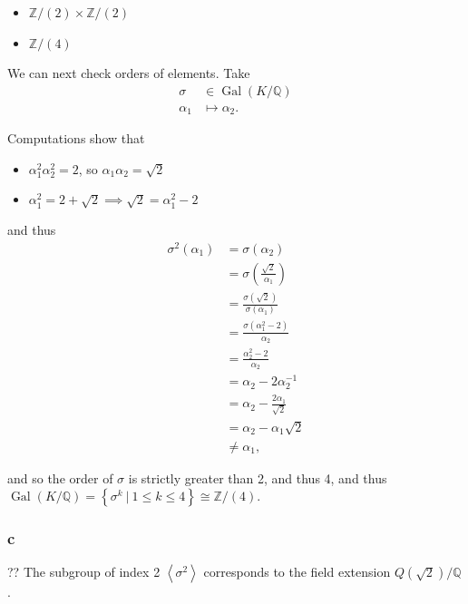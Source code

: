 \begin{solution}
\begin{itemize}
\tightlist
\item
  \({\mathbb{Z}}/(2) \times{\mathbb{Z}}/(2)\)
\item
  \({\mathbb{Z}}/(4)\)
\end{itemize}

We can next check orders of elements. Take
\begin{align*}
\sigma &\in \operatorname{Gal}(K/{\mathbb{Q}}) \\
\alpha_1 &\mapsto \alpha_2
.\end{align*}

Computations show that

\begin{itemize}
\tightlist
\item
  \(\alpha_1^2 \alpha_2^2 = 2\), so \(\alpha_1 \alpha_2 = \sqrt 2\)
\item
  \(\alpha_1^2 = 2 + \sqrt 2 \implies \sqrt 2 = \alpha_1^2 - 2\)
\end{itemize}

and thus
\begin{align*}
\sigma^2(\alpha_1) &= \sigma(\alpha_2) \\
&= \sigma\left(\frac{\sqrt 2}{\alpha_1}\right) \\
&= \frac{\sigma(\sqrt 2)}{\sigma(\alpha_1)} \\
&= \frac{\sigma(\alpha_1^2 - 2)}{\alpha_2} \\
&= \frac{\alpha_2^2 - 2}{\alpha_2} \\
&= \alpha_2 -2\alpha_2^{-1}\\
&= \alpha_2 - \frac{2\alpha_1}{\sqrt 2} \\
&= \alpha_2 -\alpha_1 \sqrt 2 \\
&\neq \alpha_1
,\end{align*}

and so the order of \(\sigma\) is strictly greater than 2, and thus 4,
and thus
\(\operatorname{Gal}(K/{\mathbb{Q}}) = \left\{{\sigma^k {~\mathrel{\Big|}~}1\leq k \leq 4}\right\} \cong {\mathbb{Z}}/(4)\).

\hypertarget{c-34}{%
\subsubsection{c}\label{c-34}}

?? The subgroup of index 2 \(\left\langle{\sigma^2}\right\rangle\)
corresponds to the field extension \(Q(\sqrt 2) / {\mathbb{Q}}\).

\end{solution}

